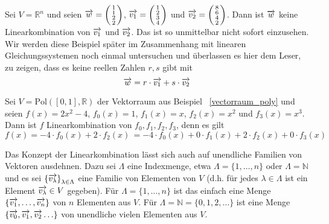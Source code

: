 \begin{beispiel} Sei $V = \mathbb R^n$ und seien $\overrightarrow{w} = 
\left( \begin{smallmatrix} 1 \\ 1 \\ 2 \\ 2 \end{smallmatrix}  \right)$, 
$\overrightarrow{v_1} = \left( \begin{smallmatrix} 1 \\ 2 \\ 3 \\ 4 \end{smallmatrix} 
\right)$ und  $\overrightarrow{v_2} =
\left( \begin{smallmatrix} 8 \\ 6 \\ 4 \\ 2 \end{smallmatrix} \right)$. Dann ist 
$\overrightarrow{w}$ keine Linearkombination von $\overrightarrow{v_1}$ und 
$\overrightarrow{v_2}$. Das ist so unmittelbar nicht sofort einzusehen. Wir werden 
diese Beispiel später im Zusammenhang mit linearen Gleichungssystemen noch einmal 
untersuchen und überlassen es hier dem Leser, zu zeigen, dass es keine reellen 
Zahlen $r, s$ gibt mit 
  	$$ \overrightarrow{w} = r \cdot \overrightarrow{v_1} + s \cdot \overrightarrow{v_2} $$
\end{beispiel}

\begin{beispiel} Sei $V = \textrm{Pol}([0,1], \mathbb R)$ der Vektorraum aus Beispiel 
~\ref{vectorraum_poly} und seien $f(x) = 2x^2 - 4$, $f_0(x) = 1$, $f_1(x) = x$, 
$f_2(x) = x^2$ und $f_3(x) = x^3$. Dann ist $f$ Linearkombination von $f_0, f_1, f_2, 
f_3$, denn es gilt
  	$$ f(x) = -4 \cdot f_0(x) + 2 \cdot f_2(x) \,  = -4 \cdot f_0(x) + 0 \cdot f_1(x) 
   	+ 2 \cdot f_2(x) + 0 \cdot f_3(x) $$
\end{beispiel}

Das Konzept der Linearkombination lässt sich auch auf unendliche Familien von 
Vektoren ausdehnen. Dazu sei $\Lambda$ eine Indexmenge, etwa $\Lambda = \{ 1, 
\ldots , n \}$ oder $\Lambda = \mathbb N$ und es sei $\left\{ 
\overrightarrow{v_{\lambda}} \right\}_{\lambda \in \Lambda}$ eine Familie von 
Elementen von $V$ (d.h. für jedes $\lambda \in \Lambda$ ist ein Element 
$\overrightarrow{v_{\lambda}} \in V$ gegeben). Für $\Lambda = \{ 1, 
\ldots , n \}$ ist das einfach eine Menge $\{ \overrightarrow{v_1}, \ldots , 
\overrightarrow{v_n} \}$ von $n$ Elementen aus $V$. Für $\Lambda = \mathbb N = 
\{ 0, 1, 2, \ldots  \}$ ist eine Menge $\{ \overrightarrow{v_0}, 
\overrightarrow{v_1}, \overrightarrow{v_2} \ldots  \}$ von 
unendliche vielen Elementen aus $V$. 

